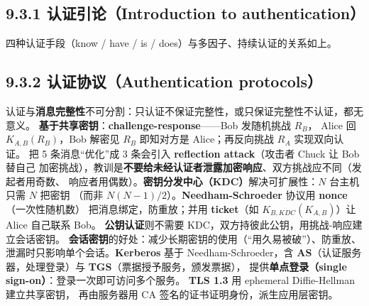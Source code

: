 \subsection*{9.3.1 认证引论（Introduction to authentication）}
四种认证手段（know / have / is / does）与多因子、持续认证的关系如上。

\begin{closeread}
\end{closeread}


\subsection*{9.3.2 认证协议（Authentication protocols）}
认证与\textbf{消息完整性}不可分割：只认证不保证完整性，或只保证完整性不认证，都无意义。
\textbf{基于共享密钥}：\textbf{challenge-response}——Bob 发随机挑战 $R_B$，
Alice 回 $K_{A,B}(R_B)$，Bob 解密见 $R_B$ 即知对方是 Alice；再反向挑战 $R_A$ 实现双向认证。
把 5 条消息“优化”成 3 条会引入 \textbf{reflection attack}（攻击者 Chuck 让 Bob 替自己
加密挑战），教训是\textbf{不要给未经认证者泄露加密响应}、双方挑战应不同（发起者用奇数、
响应者用偶数）。\textbf{密钥分发中心（KDC）}解决可扩展性：$N$ 台主机只需 $N$ 把密钥
（而非 $N(N-1)/2$）。\textbf{Needham-Schroeder} 协议用 \textbf{nonce}（一次性随机数）
把消息绑定，防重放；并用 \textbf{ticket}（如 $K_{B,KDC}(K_{A,B})$）让 Alice 自己联系 Bob。
\textbf{公钥认证}则不需要 KDC，双方持彼此公钥，用挑战-响应建立会话密钥。
\textbf{会话密钥}的好处：减少长期密钥的使用（“用久易被破”）、防重放、
泄漏时只影响单个会话。\textbf{Kerberos} 基于 Needham-Schroeder，含
\textbf{AS}（认证服务器，处理登录）与 \textbf{TGS}（票据授予服务，颁发票据），
提供\textbf{单点登录（single sign-on）}：登录一次即可访问多个服务。
\textbf{TLS 1.3} 用 ephemeral Diffie-Hellman 建立共享密钥，
再由服务器用 CA 签名的证书证明身份，派生应用层密钥。

\begin{closeread}
\end{closeread}


